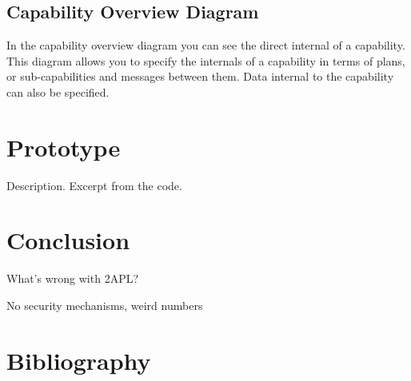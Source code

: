 \documentclass[a4paper]{article}
\begin{document}
\subsection{Capability Overview Diagram}
In the capability overview diagram you can see the direct internal of a capability. This diagram allows you to specify the internals of a capability in terms of plans, or sub-capabilities and messages between them. Data internal to the capability can also be specified.

\section{Prototype}\label{sec:proto} 

Description. Excerpt from the code.

\section{Conclusion}\label{sec:concl} 

What's wrong with 2APL?

No security mechanisms, weird numbers

\section{Bibliography}
\nocite{*}


\end{document}
